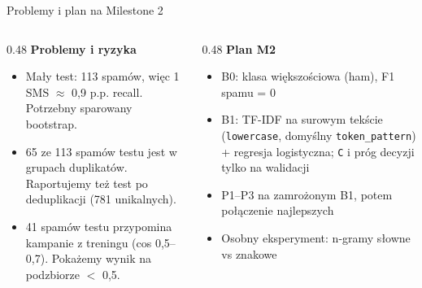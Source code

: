 \documentclass[aspectratio=169,10pt]{beamer}
\begin{document}
\begin{frame}{Problemy i plan na Milestone 2}
  \begin{columns}[T]
    \begin{column}{0.48\textwidth}
      \textbf{Problemy i ryzyka}
      \begin{itemize}
        \item Mały test: 113 spamów, więc 1 SMS $\approx$ 0,9 p.p. recall. Potrzebny sparowany bootstrap.
        \item 65 ze 113 spamów testu jest w grupach duplikatów. Raportujemy też test po deduplikacji (781 unikalnych).
        \item 41 spamów testu przypomina kampanie z treningu (cos 0,5--0,7). Pokażemy wynik na podzbiorze $<$ 0,5.
      \end{itemize}
    \end{column}
    \begin{column}{0.48\textwidth}
      \textbf{Plan M2}
      \begin{itemize}
        \item B0: klasa większościowa (ham), F1 spamu = 0
        \item B1: TF-IDF na surowym tekście (\texttt{lowercase}, domyślny \texttt{token\_pattern}) + regresja logistyczna;
          \texttt{C} i próg decyzji tylko na walidacji
        \item P1--P3 na zamrożonym B1, potem połączenie najlepszych
        \item Osobny eksperyment: n-gramy słowne vs znakowe
      \end{itemize}
    \end{column}
  \end{columns}
\end{frame}
\end{document}
